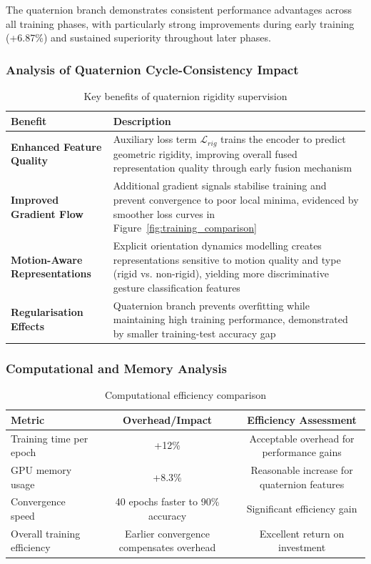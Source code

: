 \documentclass[journal]{IEEEtran}
\theoremstyle{plain}
\begin{document}
The quaternion branch demonstrates consistent performance advantages across all training phases, with particularly strong improvements during early training (+6.87\%) and sustained superiority throughout later phases.

\subsubsection{Analysis of Quaternion Cycle-Consistency Impact}
\begin{table}[!ht]
\centering
\caption{Key benefits of quaternion rigidity supervision}
\label{tab:quaternion_benefits}
\small
\begin{tabular}{@{}lp{7cm}@{}}
\hline
\textbf{Benefit} & \textbf{Description} \\
\hline
\textbf{Enhanced Feature Quality} & Auxiliary loss term $\mathcal{L}_{rig}$ trains the encoder to predict geometric rigidity, improving overall fused representation quality through early fusion mechanism \\
\textbf{Improved Gradient Flow} & Additional gradient signals stabilise training and prevent convergence to poor local minima, evidenced by smoother loss curves in Figure~\ref{fig:training_comparison} \\
\textbf{Motion-Aware Representations} & Explicit orientation dynamics modelling creates representations sensitive to motion quality and type (rigid vs. non-rigid), yielding more discriminative gesture classification features \\
\textbf{Regularisation Effects} & Quaternion branch prevents overfitting while maintaining high training performance, demonstrated by smaller training-test accuracy gap \\
\hline
\end{tabular}
\end{table}

\subsubsection{Computational and Memory Analysis}
\begin{table}[!ht]
\centering
\caption{Computational efficiency comparison}
\label{tab:computational_efficiency}
\small
\begin{tabular}{@{}lcc@{}}
\hline
\textbf{Metric} & \textbf{Overhead/Impact} & \textbf{Efficiency Assessment} \\
\hline
Training time per epoch & +12\% & Acceptable overhead for performance gains \\
GPU memory usage & +8.3\% & Reasonable increase for quaternion features \\
Convergence speed & 40 epochs faster to 90\% accuracy & Significant efficiency gain \\
Overall training efficiency & Earlier convergence compensates overhead & Excellent return on investment \\
\hline
\end{tabular}
\end{table}
\end{document}
